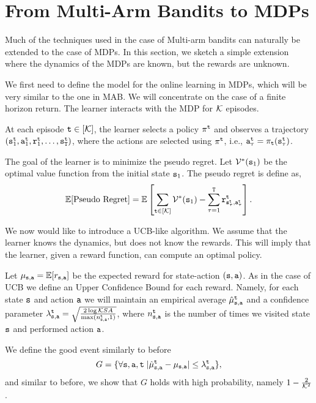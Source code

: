 \section{From Multi-Arm Bandits to MDPs}

Much of the techniques used in the case of Multi-arm bandits can naturally be extended  to the case of MDPs. In this section, we sketch a simple extension where the dynamics of the MDPs are known, but the rewards are unknown.

We first need to define the model for the online learning in MDPs, which will be very similar to the one in MAB. We will concentrate on the case of a finite horizon return. The learner interacts with the MDP for $\mathcal K$ episodes.

At each episode ${\tt t}\in[\mathcal K]$, the learner selects a policy $\pi^{\tt t}$ and observes a trajectory $({\tt s}^{\tt t}_1, {\tt a}^{\tt t}_1,{\tt r}^{\tt t}_1 , \ldots , {\tt s}_{\tt T}^{\tt t})$, where the actions are selected using $\pi^{\tt t}$, i.e., ${\tt a}_\tau^{\tt t}=\pi_{\tt t}({\tt s}_\tau^{\tt t})$.

The goal of the learner is to minimize the pseudo regret. Let $\mathcal{V}^*({\tt s}_1)$ be the optimal value function from the initial state ${\tt s}_1$. The pseudo regret is define as,
\[
\mathbb{E}[\text{Pseudo Regret}] = \mathbb{E}\left[\sum_{{\tt t}\in[\mathcal K]}\mathcal{V}^*({\tt s}_1)-\sum_{\tau=1}^{\tt T} {\tt r}^{\tt t}_{{\tt s}_\tau^{\tt t},{\tt a}_\tau^{\tt t}}\right].
\]

We now would like to introduce a UCB-like algorithm. We   assume that the learner knows the dynamics, but does not know the rewards. This will imply that the learner, given a reward function, can compute an optimal policy.

Let $\mu_{{\tt s},{\tt a}}=\mathbb{E}[r_{{\tt s},{\tt a}}]$ be the expected reward for state-action $({\tt s},{\tt a})$.
%
As in the case of UCB we  define an Upper Confidence Bound for each reward. Namely, for each state ${\tt s}$ and action ${\tt a}$ we will maintain an empirical average $\hat{\mu}^{\tt t}_{{\tt s},{\tt a}}$ and a confidence parameter $\lambda^{\tt t}_{{\tt s},{\tt a}}=\sqrt{\frac{2\log \mathcal K SA}{\max(n_{{\tt s},{\tt a}}^{\tt t},1)}}$, where $n_{{\tt s},{\tt a}}^{\tt t}$ is the number of times we visited state ${\tt s}$ and performed action ${\tt a}$.

We define the good event similarly to before
\[
G=\{\forall{\tt s},{\tt a}, {\tt t}\; |\hat{\mu}^{\tt t}_{{\tt s},{\tt a}}-\mu_{{\tt s},{\tt a}}|\leq \lambda_{{\tt s},{\tt a}}^{\tt t}\},
\]
and similar to before, we show that $G$ holds with high probability, namely $1-\frac{2}{\mathcal K^2}$.

